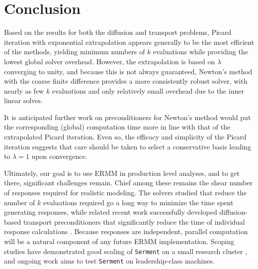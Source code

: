 \section{Conclusion}
\label{sec:conclusion}

Based on the results for both the diffusion and transport problems, Picard 
iteration with exponential extrapolation appears generally to be the most
efficient of the methods, yielding minimum numbers of $k$ evaluations 
while providing the lowest global solver overhead.  However, the 
extrapolation is based on $\lambda$ converging to unity, and because this 
is not always guaranteed, Newton's method with the coarse finite difference 
provides a more consistently robust solver, with nearly as 
few $k$ evaluations and only relatively small overhead due to the 
inner linear solves.

It is anticipated further work on preconditioners for Newton's method 
would put the corresponding (global) computation time more in line with 
that of the extrapolated Picard iteration.  Even so, the efficacy and 
simplicity of the Picard iteration suggests that care should be taken to 
select a conservative basis leading to $\lambda = 1$ upon convergence.

Ultimately, our goal is to use ERMM in production level analyses, 
and to get there, significant challenges remain.  Chief among these 
remains the shear number of responses required for realistic 
modeling.  The solvers studied that reduce the number of $k$ evaluations 
required go a long way to minimize the time spent generating  
responses, while  
related recent work successfully developed diffusion-based 
transport preconditioners that significantly reduce the time of 
individual response calculations \cite{roberts2014dpm}.  Because 
responses are independent, parallel computation will be a natural 
component of 
any future ERMM implementation.  Scoping studies have demonstrated 
good scaling of {\tt Serment} on a small research 
cluster \cite{roberts2014arm}, and ongoing work aims to test {\tt Serment} on 
leadership-class machines.
